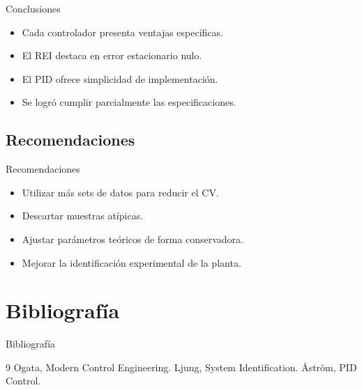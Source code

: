 \documentclass[mathserif,spanish]{beamer}
\begin{document}
\begin{frame}{Conclusiones}
\begin{itemize}
\item Cada controlador presenta ventajas específicas.
\item El REI destaca en error estacionario nulo.
\item El PID ofrece simplicidad de implementación.
\item Se logró cumplir parcialmente las especificaciones.
\end{itemize}
\end{frame}

\subsection{Recomendaciones}

\begin{frame}{Recomendaciones}
\begin{itemize}
\item Utilizar más sets de datos para reducir el CV.
\item Descartar muestras atípicas.
\item Ajustar parámetros teóricos de forma conservadora.
\item Mejorar la identificación experimental de la planta.
\end{itemize}
\end{frame}

\section{Bibliografía}

\begin{frame}{Bibliografía}
\footnotesize
\begin{thebibliography}{9}
 Ogata, Modern Control Engineering.
 Ljung, System Identification.
 Åström, PID Control.
\end{thebibliography}
\end{frame}
\end{document}
